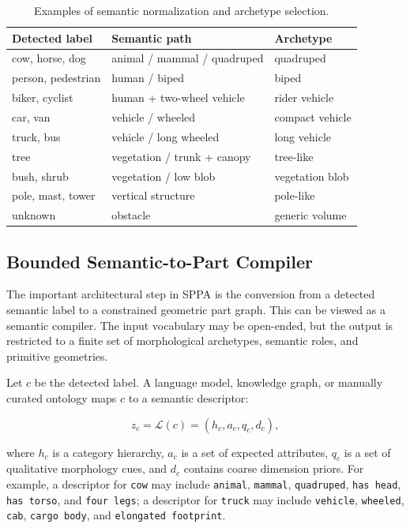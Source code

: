 ﻿\documentclass[11pt,a4paper]{article}
\begin{document}
\begin{table}[h]
\centering
\caption{Examples of semantic normalization and archetype selection.}
\label{tab:archetypes}
\begin{tabular}{@{}lll@{}}
\toprule
Detected label & Semantic path & Archetype \\
\midrule
cow, horse, dog & animal / mammal / quadruped & quadruped \\
person, pedestrian & human / biped & biped \\
biker, cyclist & human + two-wheel vehicle & rider vehicle \\
car, van & vehicle / wheeled & compact vehicle \\
truck, bus & vehicle / long wheeled & long vehicle \\
tree & vegetation / trunk + canopy & tree-like \\
bush, shrub & vegetation / low blob & vegetation blob \\
pole, mast, tower & vertical structure & pole-like \\
unknown & obstacle & generic volume \\
\bottomrule
\end{tabular}
\end{table}

\subsection{Bounded Semantic-to-Part Compiler}

The important architectural step in SPPA is the conversion from a detected
semantic label to a constrained geometric part graph. This can be viewed as a
semantic compiler. The input vocabulary may be open-ended, but the output is
restricted to a finite set of morphological archetypes, semantic
roles, and primitive geometries.

Let \(c\) be the detected label. A language model, knowledge graph, or manually
curated ontology maps \(c\) to a semantic descriptor:

\[
z_c = \mathcal{L}(c) =
\left(h_c, a_c, q_c, d_c\right),
\]

where \(h_c\) is a category hierarchy, \(a_c\) is a set of expected attributes,
\(q_c\) is a set of qualitative morphology cues, and \(d_c\) contains coarse
dimension priors. For example, a descriptor for \texttt{cow} may include
\texttt{animal}, \texttt{mammal}, \texttt{quadruped}, \texttt{has head},
\texttt{has torso}, and \texttt{four legs}; a descriptor for \texttt{truck} may
include \texttt{vehicle}, \texttt{wheeled}, \texttt{cab}, \texttt{cargo body},
and \texttt{elongated footprint}.
\end{document}

